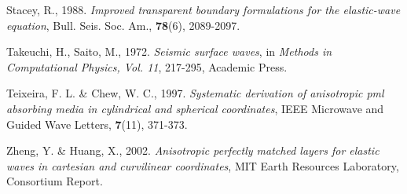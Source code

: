 \begin{thebibliography}{99}
 Stacey, R., 1988. \emph{Improved transparent
boundary formulations for the elastic-wave equation}, Bull. Seis.
Soc. Am., \textbf{78}(6), 2089-2097.

 Takeuchi, H., Saito, M., 1972. \emph{Seismic
surface waves}, in \emph{Methods in Computational Physics, Vol. 11},
217-295, Academic Press.

 Teixeira, F. L. \& Chew, W. C., 1997.
\emph{Systematic derivation of anisotropic pml absorbing media in
cylindrical and spherical coordinates}, IEEE Microwave and Guided
Wave Letters, \textbf{7}(11), 371-373.

 Zheng, Y. \& Huang, X., 2002. \emph{Anisotropic
perfectly matched layers for elastic waves in cartesian and
curvilinear coordinates}, MIT Earth Resources Laboratory, Consortium
Report.

\end{thebibliography}

